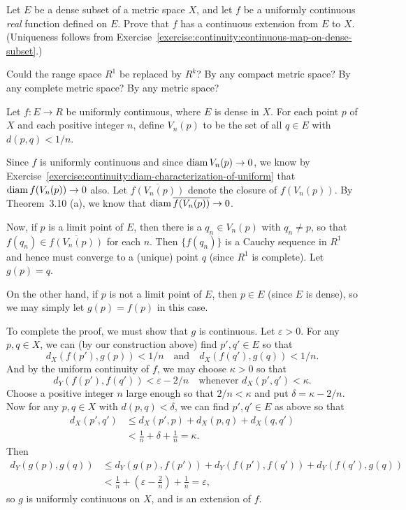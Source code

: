 Let $E$ be a dense subset of a metric space $X$, and let
$f$ be a uniformly continuous {\em real} function defined on
$E$. Prove that $f$ has a continuous extension from $E$ to
$X$. (Uniqueness follows from
Exercise~\ref{exercise:continuity:continuous-map-on-dense-subset}.)

Could the range space $R^1$ be replaced by $R^k$? By any compact
metric space? By any complete metric space? By any metric space?
\begin{solution}
  Let $f\colon E\to R$ be uniformly continuous, where $E$ is dense in
  $X$. For each point $p$ of $X$ and each positive integer $n$, define
  $V_n(p)$ to be the set of all $q\in E$ with $d(p,q) < 1/n$.

  Since $f$ is uniformly continuous and since $\operatorname{diam} V_n(p)\to 0$, we
  know by
  Exercise~\ref{exercise:continuity:diam-characterization-of-uniform}
  that $\operatorname{diam} f(V_n(p))\to 0$ also. Let $\overline{f(V_n(p))}$ denote
  the closure of $f(V_n(p))$. By Theorem~3.10 (a), we know that
  $\operatorname{diam}\overline{f(V_n(p))}\to 0$.

  Now, if $p$ is a limit point of $E$, then there is a $q_n\in V_n(p)$
  with $q_n\neq p$, so that $f(q_n)\in\overline{f(V_n(p))}$ for each
  $n$. Then $\{f(q_n)\}$ is a Cauchy sequence in $R^1$ and hence must
  converge to a (unique) point $q$ (since $R^1$ is complete). Let
  $g(p) = q$.

  On the other hand, if $p$ is not a limit point of $E$, then $p\in E$
  (since $E$ is dense), so we may simply let $g(p) = f(p)$ in this
  case.

  To complete the proof, we must show that $g$ is continuous. Let
  $\varepsilon > 0$. For any $p,q\in X$, we can (by our construction
  above) find $p',q'\in E$ so that
  \begin{equation*}
    d_X(f(p'),g(p)) < 1/n \quad\text{and}\quad d_X(f(q'),g(q)) < 1/n.
  \end{equation*}
  And by the uniform continuity of $f$, we may choose $\kappa > 0$ so
  that
  \begin{equation*}
    d_Y(f(p'),f(q')) < \varepsilon - 2/n
    \quad\text{whenever $d_X(p',q') < \kappa$}.
  \end{equation*}
  Choose a positive integer $n$ large enough so that $2/n < \kappa$
  and put $\delta = \kappa - 2/n$. Now for any $p,q\in X$ with
  $d(p,q) < \delta$, we can find $p',q'\in E$ as above so that
  \begin{align*}
    d_X(p',q') &\leq d_X(p',p) + d_X(p,q) + d_X(q,q') \\
               &< \frac1n + \delta + \frac1n
               = \kappa.
  \end{align*}
  Then
  \begin{align*}
    d_Y(g(p),g(q))
    &\leq d_Y(g(p),f(p')) + d_Y(f(p'), f(q')) + d_Y(f(q'), g(q)) \\
    &< \frac1n + \left(\varepsilon - \frac2n\right) + \frac1n
    = \varepsilon,
  \end{align*}
  so $g$ is uniformly continuous on $X$, and is an extension of $f$.


\end{solution}
